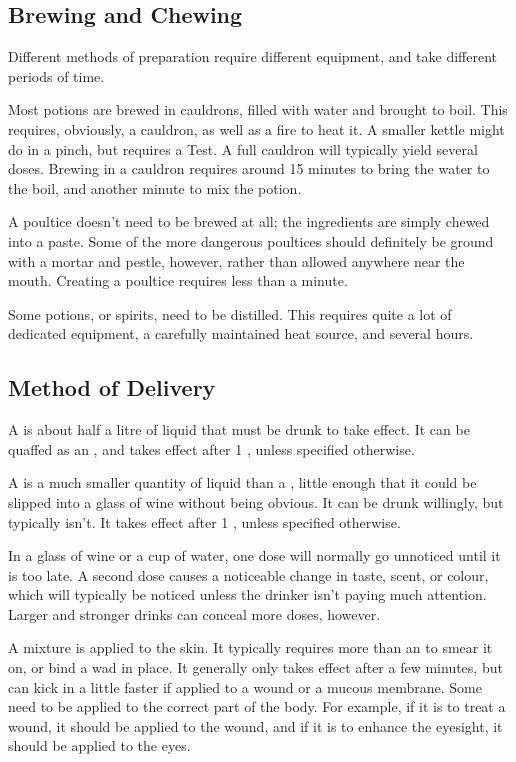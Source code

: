 \subsection{Brewing and Chewing}

Different methods of preparation require different equipment, and take different periods of time.

Most potions are brewed in cauldrons, filled with water and brought to boil.
This requires, obviously, a cauldron, as well as a fire to heat it.
A smaller kettle might do in a pinch, but requires a Test.
A full cauldron will typically yield several doses.
Brewing in a cauldron requires around 15 minutes to bring the water to the boil, and another minute to mix the potion.

A poultice doesn't need to be brewed at all; the ingredients are simply chewed into a paste.
Some of the more dangerous poultices should definitely be ground with a mortar and pestle, however, rather than allowed anywhere near the mouth.
Creating a poultice requires less than a minute.

Some potions, or spirits, need to be distilled.
This requires quite a lot of dedicated equipment, a carefully maintained heat source, and several hours.

\subsection{Method of Delivery}

A  is about half a litre of liquid that must be drunk to take effect.
It can be quaffed as an {\action}, and takes effect after 1 {\round}, unless specified otherwise.

A  is a much smaller quantity of liquid than a , little enough that it could be slipped into a glass of wine without being obvious.
It can be drunk willingly, but typically isn't.
It takes effect after 1 {\round}, unless specified otherwise.

In a glass of wine or a cup of water, one dose will normally go unnoticed until it is too late.
A second dose causes a noticeable change in taste, scent, or colour, which will typically be noticed unless the drinker isn't paying much attention.
Larger and stronger drinks can conceal more doses, however.

A  mixture is applied to the skin.
It typically requires more than an {\action} to smear it on, or bind a wad in place.
It generally only takes effect after a few minutes, but can kick in a little faster if applied to a wound or a mucous membrane.
Some need to be applied to the correct part of the body.
For example, if it is to treat a wound, it should be applied to the wound, and if it is to enhance the eyesight, it should be applied to the eyes.

